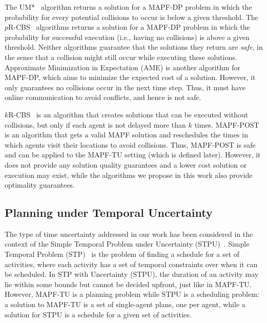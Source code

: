 \documentclass[jair,twoside,11pt,theapa]{article}
\newcommand{\mapftu}{MAPF-TU\xspace}
\begin{document}
The UM*~ algorithm returns a solution for a MAPF-DP problem in which the probability for every potential collisions to occur is below a given threshold. 
The $p$R-CBS~ algorithms returns a solution for a MAPF-DP problem in which the probability for successful execution (i.e., having no collisions) is above a given threshold. 
Neither algorithms guarantee that the solutions they return are \emph{safe}, in the sense that a collision might still occur while executing these solutions. 
Approximate Minimization in Expectation (AME) is another algorithm for MAPF-DP, which aims to minimize the expected cost of a solution. However, it only guarantees no collisions occur in the next time step. 
Thus, it must have online communication to avoid conflicts, and hence is not safe.


$k$R-CBS~ is an algorithm that creates solutions that can be executed without collisions, but only if each agent is not delayed more than $k$ times. 
MAPF-POST~ is an algorithm that gets a valid MAPF solution and reschedules the times in which agents visit their locations to avoid collisions. Thus, MAPF-POST is safe and can be applied to the \mapftu setting (which is defined later). However, it does not provide any solution quality guarantees and a lower cost solution or execution may exist, while the algorithms we propose in this work also provide optimality guarantees. 


  
\subsection{Planning under Temporal Uncertainty}
%







The type of time uncertainty addressed in our work has been considered in the context of the Simple Temporal Problem under Uncertainty (STPU)~. Simple Temporal Problem (STP)~ is the problem of finding a schedule for a set of activities, 
where each activity has a set of temporal constraints over when it can be scheduled. 
In STP with Uncertainty (STPU), the duration of an activity may lie within some bounds but cannot be decided upfront, just like in \mapftu. 
However, \mapftu is a planning problem while STPU is a scheduling problem: a solution to MAPF-TU is a set of single-agent plans, one per agent, while a solution for STPU is a schedule for a given set of activities. 
\end{document}
